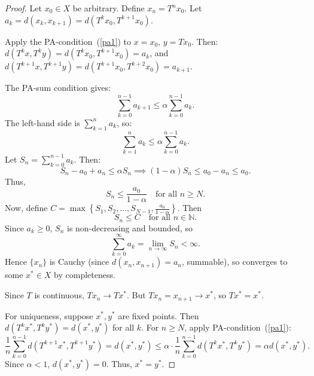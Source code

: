 \documentclass[10pt,a4paper]{amsart}
\begin{document}
\begin{proof}
Let $ x_0 \in X $ be arbitrary. Define $ x_n = T^n x_0 $. Let $ a_k = d(x_k, x_{k+1}) = d(T^k x_0, T^{k+1} x_0) $.

Apply the PA-condition~(\ref{pa1}) to $ x = x_0 $, $ y = T x_0 $. Then:
$ d(T^k x, T^k y) = d(T^k x_0, T^{k+1} x_0) = a_k $, and
$ d(T^{k+1}x, T^{k+1}y) = d(T^{k+1} x_0, T^{k+2} x_0) = a_{k+1} $.

The PA-sum condition gives:
\begin{equation}
\sum_{k=0}^{n-1} a_{k+1} \leq \alpha \sum_{k=0}^{n-1} a_k.
\end{equation}
The left-hand side is $ \sum_{k=1}^{n} a_k $, so:
\begin{equation}
\sum_{k=1}^{n} a_k \leq \alpha \sum_{k=0}^{n-1} a_k.
\end{equation}
Let $ S_n = \sum_{k=0}^{n-1} a_k $. Then:
\begin{equation}
S_n - a_0 + a_n \leq \alpha S_n \implies (1 - \alpha) S_n \leq a_0 - a_n \leq a_0.
\end{equation}
Thus,
\begin{equation}
S_n \leq \frac{a_0}{1 - \alpha} \quad \text{for all } n \ge N.
\end{equation}
Now, define $ C = \max\left\{ S_1, S_2, \dots, S_{N-1}, \frac{a_0}{1 - \alpha} \right\} $. Then
\begin{equation}
S_n \leq C \quad \text{for all } n \in \mathbb{N}.
\end{equation}
Since $ a_k \geq 0 $, $ S_n $ is non-decreasing and bounded, so
\begin{equation}
\sum_{k=0}^{\infty} a_k = \lim_{n \to \infty} S_n < \infty.
\end{equation}
Hence $ \{x_n\} $ is Cauchy (since $ d(x_n, x_{n+1}) = a_n $, summable), so converges to some $ x^* \in X $ by completeness.



Since $ T $ is continuous, $ T x_n \to T x^* $. But $ T x_n = x_{n+1} \to x^* $, so $ T x^* = x^* $.

For uniqueness, suppose $ x^*, y^* $ are fixed points. Then $ d(T^k x^*, T^k y^*) = d(x^*, y^*) $ for all $ k $. For $n \ge N$, apply PA-condition~(\ref{pa1}):
\begin{equation}
\frac{1}{n} \sum_{k=0}^{n-1} d(T^{k+1}x^*, T^{k+1}y^*) = d(x^*, y^*) \leq \alpha \cdot \frac{1}{n} \sum_{k=0}^{n-1} d(T^k x^*, T^k y^*) = \alpha d(x^*, y^*).
\end{equation}
Since $ \alpha < 1 $, $ d(x^*, y^*) = 0 $. Thus, $ x^* = y^* $.
\end{proof}
\end{document}
